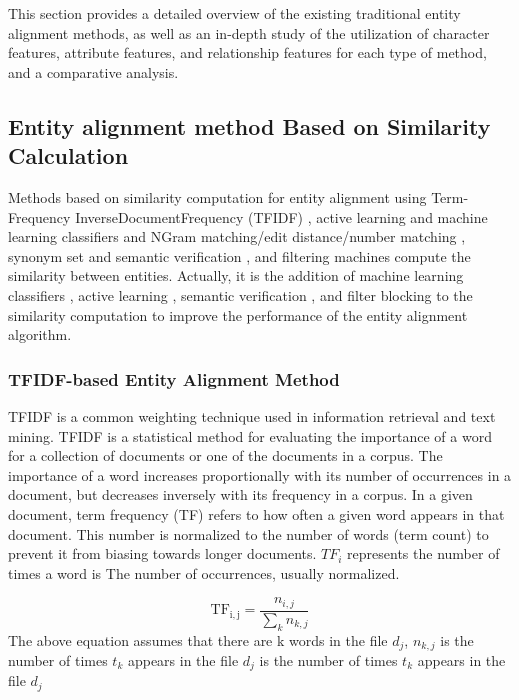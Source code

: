 \documentclass[sigconf]{acmart}
\begin{document}
This section provides a detailed overview of the existing traditional entity alignment methods, as well as an in-depth study of the utilization of character features, attribute features, and relationship features for each type of method, and a comparative analysis.


\subsection{Entity alignment method Based on Similarity Calculation}

Methods based on similarity computation for entity alignment using Term-Frequency InverseDocumentFrequency (TFIDF) \cite{cohen2002learning} , active learning and machine learning classifiers and NGram matching/edit distance/number matching \cite{sarawagi2002interactive}, synonym set and semantic verification \cite{jean2009ontology}, and filtering machines \cite{arasu2010active} compute the similarity between entities. Actually, it is the addition of machine learning classifiers \cite{sarawagi2002interactive}, active learning \cite{sarawagi2002interactive}, semantic verification \cite{jean2009ontology}, and filter blocking \cite{arasu2010active} to the similarity computation to improve the performance of the entity alignment algorithm.

\subsubsection{TFIDF-based Entity Alignment Method}

TFIDF is a common weighting technique used in information retrieval and text mining. TFIDF is a statistical method for evaluating the importance of a word for a collection of documents or one of the documents in a corpus. The importance of a word increases proportionally with its number of occurrences in a document, but decreases inversely with its frequency in a corpus. In a given document, term frequency (TF) refers to how often a given word appears in that document. This number is normalized to the number of words (term count) to prevent it from biasing towards longer documents. $TF_i$ represents the number of times a word is The number of occurrences, usually normalized.

\begin{equation}
{\mathrm  {TF_{{i,j}}}}={\frac  {n_{{i,j}}}{\sum _{k}n_{{k,j}}}}
\end{equation}
The above equation assumes that there are k words in the file $d_{{j}}$, $n_{k,j}$ is the number of times $t_{k}$ appears in the file $d_{j}$ is the number of times $t_{k}$ appears in the file $d_{j}$
\end{document}
